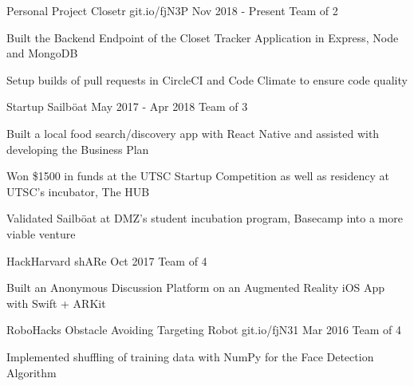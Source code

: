 \begin{cventries}
\cventry
    {Personal Project}
    {Closetr}
    {git.io/fjN3P}
    {Nov 2018 - Present}
    {Team of 2}
    {
      \begin{cvitems}
        \item{Built the Backend Endpoint of the Closet Tracker Application in Express, Node and MongoDB}
        \item{Setup builds of pull requests in CircleCI and Code Climate to ensure code quality}
      \end{cvitems}
    }
\cventry
  {Startup}
  {Sailböat}
  {}
  {May 2017 - Apr 2018}
  {Team of 3}
  {
    \begin{cvitems}
      \item {Built a local food search/discovery app with React Native and assisted with developing the Business Plan}
      \item {Won \$1500 in funds at the UTSC Startup Competition as well as residency at UTSC's incubator, The HUB}
      \item {Validated Sailböat at DMZ's student incubation program, Basecamp into a more viable venture}
    \end{cvitems}
  }
\cventry
  {HackHarvard}
  {shARe}
  {}
  {Oct 2017}
  {Team of 4}
  {
    \begin{cvitems}
      \item {Built an Anonymous Discussion Platform on an Augmented Reality iOS App with Swift + ARKit}
    \end{cvitems}
  }
\cventry
  {RoboHacks}
  {Obstacle Avoiding Targeting Robot}
  {git.io/fjN31}
  {Mar 2016}
  {Team of 4}
  {
    \begin{cvitems}
      \item {Implemented shuffling of training data with NumPy for the Face Detection Algorithm}
    \end{cvitems}
  }
\end{cventries}
